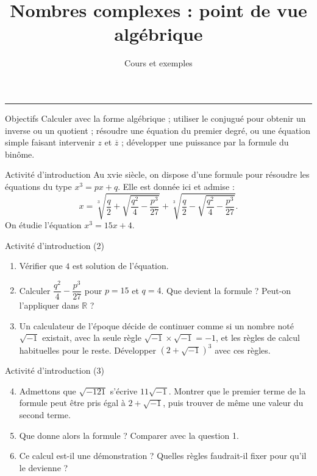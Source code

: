 \documentclass[aspectratio=169,10pt]{beamer}
\title{Nombres complexes : point de vue algébrique}
\subtitle{Cours et exemples}
\date{}
\author{}
\providecommand{\R}{\mathbb{R}}
\begin{document}
\begin{frame}[plain]
\vfill
{\inserttitle\par}
\medskip
{\insertsubtitle\par}
\medskip
{\rule{\textwidth}{.5pt}}
\vfill
\end{frame}
\begin{frame}{Objectifs}
Calculer avec la forme algébrique ; utiliser le conjugué pour obtenir un inverse ou un quotient ; résoudre une équation du premier degré, ou une équation simple faisant intervenir \(z\) et \(\overline{z}\) ; développer une puissance par la formule du binôme.
\end{frame}
\begin{frame}{Activité d'introduction}
Au xvie siècle, on dispose d'une formule pour résoudre les équations du type \(x^3=px+q\). Elle est donnée ici et admise :
\[x=\sqrt[3]{\dfrac q2+\sqrt{\dfrac{q^2}{4}-\dfrac{p^3}{27}}}+\sqrt[3]{\dfrac q2-\sqrt{\dfrac{q^2}{4}-\dfrac{p^3}{27}}}.\]
On étudie l'équation \(x^3=15x+4\).
\end{frame}
\begin{frame}{Activité d'introduction (2)}
\begin{enumerate}
\setcounter{enumi}{0}\item Vérifier que \(4\) est solution de l'équation.

\item Calculer \(\dfrac{q^2}{4}-\dfrac{p^3}{27}\) pour \(p=15\) et \(q=4\). Que devient la formule ? Peut-on l'appliquer dans \(\R\) ?

\item Un calculateur de l'époque décide de continuer comme si un nombre noté \(\sqrt{-1}\) existait, avec la seule règle \(\sqrt{-1}\times\sqrt{-1}=-1\), et les règles de calcul habituelles pour le reste. Développer \(\left(2+\sqrt{-1}\right)^3\) avec ces règles.

\end{enumerate}
\end{frame}
\begin{frame}{Activité d'introduction (3)}
\begin{enumerate}
\setcounter{enumi}{3}\item Admettons que \(\sqrt{-121}\) s'écrive \(11\sqrt{-1}\). Montrer que le premier terme de la formule peut être pris égal à \(2+\sqrt{-1}\), puis trouver de même une valeur du second terme.

\item Que donne alors la formule ? Comparer avec la question 1.

\item Ce calcul est-il une démonstration ? Quelles règles faudrait-il fixer pour qu'il le devienne ?

\end{enumerate}
\end{frame}
\end{document}
